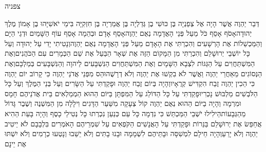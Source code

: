 \documentclass[../main/main.tex]{subfiles}
\begin{document}
\thispagestyle{empty}
\Incipit{}צפניה
\cleardoublepage
\RTLmulticolcolumns
\begin{multicols*}{\ncols}
\vspace*{-9pt} %
דְּבַר יַהְוֶה אֲשֶׁר הָיָה אֶל צְפַנְיָה בֶּן כּוּשִׁי בֶן גְּדַלְיָה בֶּן אֲמַרְיָה בֶּן חִזְקִיָּה בִּימֵי יֹאשִׁיָּהוּ בֶן אָמוֹן מֶלֶךְ יְהוּדָה\PreVerseSpace{}אָסֹף אָסֵף כֹּל מֵעַל פְּנֵי הָאֲדָמָה נְאֻם יַהְוֶה\PreVerseSpace{}אָסֵף אָדָם וּבְהֵמָה אָסֵף עוֹף הַשָּׁמַיִם וּדְגֵי הַיָּם וְהַמַּכְשֵׁלוֹת אֶת הָרְשָׁעִים וְהִכְרַתִּי אֶת הָאָדָם מֵעַל פְּנֵי הָאֲדָמָה נְאֻם יַהְוֶה\PreVerseSpace{}וְנָטִיתִי יָדִי עַל יְהוּדָה וְעַל כָּל יוֹשְׁבֵי יְרוּשָׁלֵם וְהִכְרַתִּי מִן הַמָּקוֹם הַזֶּה אֶת שְׁאָר הַבַּעַל אֶת שֵׁם הַכְּמָרִים עִם הַכֹּהֲנִים\PreVerseSpace{}וְאֶת הַמִּשְׁתַּחֲוִים עַל הַגַּגּוֹת לִצְבָא הַשָּׁמָיִם וְאֶת הַמִּשְׁתַּחֲוִים הַנִּשְׁבָּעִים לַיהוָה וְהַנִּשְׁבָּעִים בְּמַלְכָּם\PreVerseSpace{}וְאֶת הַנְּסוֹגִים מֵאַחֲרֵי יַהְוֶה וַאֲשֶׁר לֹא בִקְשׁוּ אֶת יַהְוֶה וְלֹא דְרָשֻׁהוּ\PreVerseSpace{}הַס מִפְּנֵי אֲדֹנַי יַהְוֶה כִּי קָרוֹב יוֹם יַהְוֶה כִּי הֵכִין יַהְוֶה זֶבַח הִקְדִּישׁ קְרֻאָיו\PreVerseSpace{}וְהָיָה בְּיוֹם זֶבַח יַהְוֶה וּפָקַדְתִּי עַל הַשָּׂרִים וְעַל בְּנֵי הַמֶּלֶךְ וְעַל כָּל הַלֹּבְשִׁים מַלְבּוּשׁ נָכְרִי\PreVerseSpace{}וּפָקַדְתִּי עַל כָּל הַדּוֹלֵג עַל הַמִּפְתָּן בַּיּוֹם הַהוּא הַמְמַלְאִים בֵּית אֲדֹנֵיהֶם חָמָס וּמִרְמָה \ClosedSection{}וְהָיָה בַיּוֹם הַהוּא נְאֻם יַהְוֶה קוֹל צְעָקָה מִשַּׁעַר הַדָּגִים וִילָלָה מִן הַמִּשְׁנֶה וְשֶׁבֶר גָּדוֹל מֵהַגְּבָעוֹת\PreVerseSpace{}הֵילִילוּ יֹשְׁבֵי הַמַּכְתֵּשׁ כִּי נִדְמָה כָּל עַם כְּנַעַן נִכְרְתוּ כָּל נְטִילֵי כָסֶף \ClosedSection{}וְהָיָה בָּעֵת הַהִיא אֲחַפֵּשׂ אֶת יְרוּשָׁלֵם בַּנֵּרוֹת וּפָקַדְתִּי עַל הָאֲנָשִׁים הַקֹּפְאִים עַל שִׁמְרֵיהֶם הָאֹמְרִים בִּלְבָבָם לֹא יֵיטִיב יַהְוֶה וְלֹא יָרֵעַ\PreVerseSpace{}וְהָיָה חֵילָם לִמְשִׁסָּה וּבָתֵּיהֶם לִשְׁמָמָה וּבָנוּ בָתִּים וְלֹא יֵשֵׁבוּ וְנָטְעוּ כְרָמִים וְלֹא יִשְׁתּוּ אֶת יֵינָם

\end{multicols*}
\end{document}
